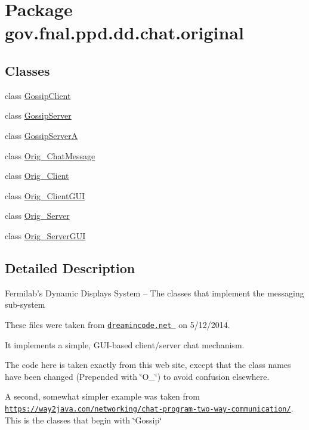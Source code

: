\hypertarget{namespacegov_1_1fnal_1_1ppd_1_1dd_1_1chat_1_1original}{\section{Package gov.\-fnal.\-ppd.\-dd.\-chat.\-original}
\label{namespacegov_1_1fnal_1_1ppd_1_1dd_1_1chat_1_1original}
}
\subsection*{Classes}
\begin{DoxyCompactItemize}
\item 
class \hyperlink{classgov_1_1fnal_1_1ppd_1_1dd_1_1chat_1_1original_1_1GossipClient}{Gossip\-Client}
\item 
class \hyperlink{classgov_1_1fnal_1_1ppd_1_1dd_1_1chat_1_1original_1_1GossipServer}{Gossip\-Server}
\item 
class \hyperlink{classgov_1_1fnal_1_1ppd_1_1dd_1_1chat_1_1original_1_1GossipServerA}{Gossip\-Server\-A}
\item 
class \hyperlink{classgov_1_1fnal_1_1ppd_1_1dd_1_1chat_1_1original_1_1Orig__ChatMessage}{Orig\-\_\-\-Chat\-Message}
\item 
class \hyperlink{classgov_1_1fnal_1_1ppd_1_1dd_1_1chat_1_1original_1_1Orig__Client}{Orig\-\_\-\-Client}
\item 
class \hyperlink{classgov_1_1fnal_1_1ppd_1_1dd_1_1chat_1_1original_1_1Orig__ClientGUI}{Orig\-\_\-\-Client\-G\-U\-I}
\item 
class \hyperlink{classgov_1_1fnal_1_1ppd_1_1dd_1_1chat_1_1original_1_1Orig__Server}{Orig\-\_\-\-Server}
\item 
class \hyperlink{classgov_1_1fnal_1_1ppd_1_1dd_1_1chat_1_1original_1_1Orig__ServerGUI}{Orig\-\_\-\-Server\-G\-U\-I}
\end{DoxyCompactItemize}


\subsection{Detailed Description}
Fermilab's Dynamic Displays System -- The classes that implement the messaging sub-\/system 

These files were taken from \href{http://www.dreamincode.net/forums/topic/259777-a-simple-chat-program-with-clientserver-gui-optional/}{\tt dreamincode.\-net } on 5/12/2014.

It implements a simple, G\-U\-I-\/based client/server chat mechanism. 

The code here is taken exactly from this web site, except that the class names have been changed (Prepended with \char`\"{}\-O\-\_\-\char`\"{}) to avoid confusion elsewhere. 

A second, somewhat simpler example was taken from \href{https://way2java.com/networking/chat-program-two-way-communication/}{\tt https\-://way2java.\-com/networking/chat-\/program-\/two-\/way-\/communication/}. This is the classes that begin with \char`\"{}\-Gossip\char`\"{} 